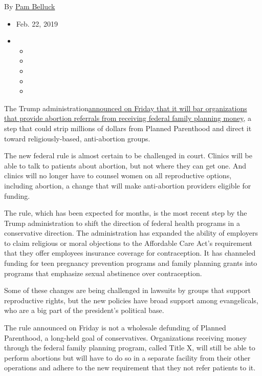 By \href{https://www.nytimes3xbfgragh.onion/by/pam-belluck}{Pam Belluck}

\begin{itemize}
\item
  Feb. 22, 2019
\item
  \begin{itemize}
  \item
  \item
  \item
  \item
  \item
  \end{itemize}
\end{itemize}

The Trump
administration\href{https://www.hhs.gov/opa/sites/default/files/title-x-notice-of-final-rule.pdf}{announced
on Friday that it will bar organizations that provide abortion referrals
from receiving federal family planning money}, a step that could strip
millions of dollars from Planned Parenthood and direct it toward
religiously-based, anti-abortion groups.

The new federal rule is almost certain to be challenged in court.
Clinics will be able to talk to patients about abortion, but not where
they can get one. And clinics will no longer have to counsel women on
all reproductive options, including abortion, a change that will make
anti-abortion providers eligible for funding.

The rule, which has been expected for months, is the most recent step by
the Trump administration to shift the direction of federal health
programs in a conservative direction. The administration has expanded
the ability of employers to claim religious or moral objections to the
Affordable Care Act's requirement that they offer employees insurance
coverage for contraception. It has channeled funding for teen pregnancy
prevention programs and family planning grants into programs that
emphasize sexual abstinence over contraception.

Some of these changes are being challenged in lawsuits by groups that
support reproductive rights, but the new policies have broad support
among evangelicals, who are a big part of the president's political
base.

The rule announced on Friday is not a wholesale defunding of Planned
Parenthood, a long-held goal of conservatives. Organizations receiving
money through the federal family planning program, called Title X, will
still be able to perform abortions but will have to do so in a separate
facility from their other operations and adhere to the new requirement
that they not refer patients to it.

